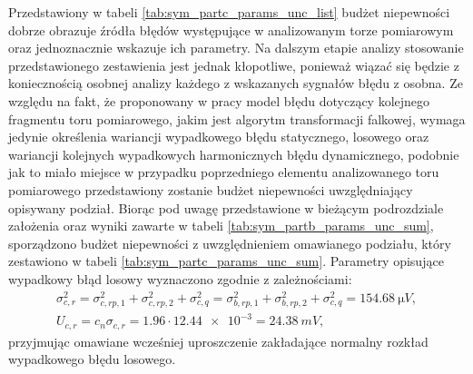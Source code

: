 Przedstawiony w tabeli \ref{tab:sym_partc_params_unc_list} budżet niepewności dobrze obrazuje źródła błędów występujące w analizowanym torze pomiarowym oraz jednoznacznie wskazuje ich parametry. Na dalszym etapie analizy stosowanie przedstawionego zestawienia jest jednak kłopotliwe, ponieważ wiązać się będzie z koniecznością osobnej analizy każdego z wskazanych sygnałów błędu z osobna. Ze względu na fakt, że proponowany w pracy model błędu dotyczący kolejnego fragmentu toru pomiarowego, jakim jest algorytm transformacji falkowej, wymaga jedynie określenia wariancji wypadkowego błędu statycznego, losowego oraz wariancji kolejnych wypadkowych harmonicznych błędu dynamicznego, podobnie jak to miało miejsce w przypadku poprzedniego elementu analizowanego toru pomiarowego przedstawiony zostanie budżet niepewności uwzględniający opisywany podział. Biorąc pod uwagę przedstawione w bieżącym podrozdziale założenia oraz wyniki zawarte w tabeli \ref{tab:sym_partb_params_unc_sum}, sporządzono budżet niepewności z uwzględnieniem omawianego podziału, który zestawiono w tabeli \ref{tab:sym_partc_params_unc_sum}. Parametry opisujące wypadkowy błąd losowy wyznaczono zgodnie z zależnościami:
\begin{gather}
\sigma_{c,r}^{2} = \sigma_{c,rp,1}^{2} + \sigma_{c,rp,2}^{2} + \sigma_{c,q}^{2} = \sigma_{b,rp,1}^{2} + \sigma_{b,rp,2}^{2} + \sigma_{c,q}^{2} = \qty{154.68}{\micro V} \label{eq:sym_partc_var_random}, \\
U_{c,r} = c_{n} \sigma_{c,r} = 1.96 \cdot \num{12.44e-3} = \qty{24.38}{mV} \label{eq:sym_partc_uncert_random},
\end{gather}
przyjmując omawiane wcześniej uproszczenie zakładające normalny rozkład wypadkowego błędu losowego.

